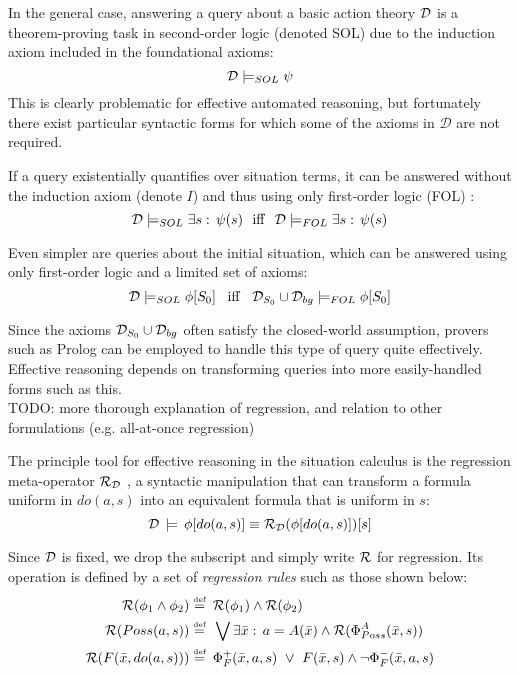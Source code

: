 In the general case, answering a query about a basic action theory
$\mathcal{D}$ is a theorem-proving task in second-order logic (denoted SOL)
due to the induction axiom included in the foundational axioms:\[
\mathcal{D}\models_{SOL}\psi\]
 This is clearly problematic for effective automated reasoning, but
fortunately there exist particular syntactic forms for which some
of the axioms in $\mathcal{D}$ are not required.

If a query existentially quantifies over situation terms, it can be
answered without the induction axiom (denote $I$) and thus using
only first-order logic (FOL) \citep{pirri99contributions_sitcalc}:\[
\mathcal{D}\models_{SOL}\exists s:\,\psi(s)\,\,\,\,\mathrm{iff}\,\,\,\,\mathcal{D}\models_{FOL}\exists s:\,\psi(s)\]


Even simpler are queries about the initial situation, which can be
answered using only first-order logic and a limited set of axioms:\[
\mathcal{D}\models_{SOL}\phi[S_{0}]\,\,\,\,\,\mathit{\mathrm{iff}}\,\,\,\,\,\mathcal{D}_{S_{0}}\cup\mathcal{D}_{bg}\models_{FOL}\phi[S_{0}]\]


Since the axioms $\mathcal{D}_{S_{0}}\cup\mathcal{D}_{bg}$ often satisfy the closed-world
assumption, provers such as Prolog can be employed to handle this
type of query quite effectively. Effective reasoning depends on transforming
queries into more easily-handled forms such as this. \\


TODO: more thorough explanation of regression, and relation to other
formulations (e.g. all-at-once regression)

The principle tool for effective reasoning in the situation calculus
is the regression meta-operator $\mathcal{R}_{\mathcal{D}}$ \citep{pirri99contributions_sitcalc},
a syntactic manipulation that can transform a formula uniform in $do(a,s)$
into an equivalent formula that is uniform in $s$:\[
\mathcal{D}\,\models\,\phi[do(a,s)]\equiv\mathcal{R}_{\mathcal{D}}(\phi[do(a,s)])[s]\]


Since $\mathcal{D}$ is fixed, we drop the subscript and simply write $\mathcal{R}$
for regression. Its operation is defined by a set of \emph{regression
rules} such as those shown below:\begin{align*}
\mathcal{R}(\phi_{1}\wedge\phi_{2})\stackrel{\mbox{\tiny def}}{=} & \,\,\,\mathcal{R}(\phi_{1})\wedge\mathcal{R}(\phi_{2})\\
\mathcal{R}(Poss(a,s))\stackrel{\mbox{\tiny def}}{=} & \,\,\,\bigvee\exists\bar{x}:\, a=A(\bar{x})\wedge\mathcal{R}(\Phi_{Poss}^{A}(\bar{x},s))\\
\mathcal{R}(F(\bar{x},do(a,s)))\stackrel{\mbox{\tiny def}}{=} & \,\,\,\Phi_{F}^{+}(\bar{x},a,s)\,\,\vee\,\, F(\bar{x},s)\wedge\neg\Phi_{F}^{-}(\bar{x},a,s)\end{align*}


